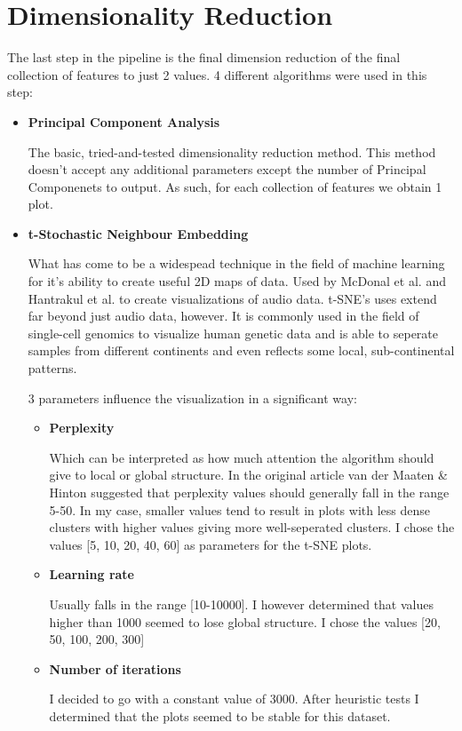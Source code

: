 \documentclass[a4paper, 12pt, twoside]{report}
\begin{document}
\section{Dimensionality Reduction}
\label{sec:orgfde1e30}

The last step in the pipeline is the final dimension reduction of the final collection of features to just 2 values. 4 different algorithms were used in this step:
\begin{itemize}
\item \textbf{Principal Component Analysis}

The basic, tried-and-tested dimensionality reduction method. This method doesn't accept any additional parameters except the number of Principal Componenets to output. As such, for each collection of features we obtain 1 plot.
\item \textbf{t-Stochastic Neighbour Embedding}

What has come to be a widespead technique in the field of machine learning for it's ability to create useful 2D maps of data. Used by McDonal et al. and Hantrakul et al. to create visualizations of audio data. t-SNE's uses extend far beyond just audio data, however. It is commonly used in the field of single-cell genomics to visualize human genetic data \cite{doi:10.1142/S0219720017500172} and is able to seperate samples from different continents and even reflects some local, sub-continental patterns.

3 parameters influence the visualization in a significant way:
\begin{itemize}
  \item \textbf{Perplexity}

    Which can be interpreted as how much attention the algorithm should give to local or global structure. In the original article van der Maaten \& Hinton suggested that perplexity values should generally fall in the range 5-50. In my case, smaller values tend to result in plots with less dense clusters with higher values giving more well-seperated clusters. I chose the values [5, 10, 20, 40, 60] as parameters for the t-SNE plots.
  \item \textbf{Learning rate}

    Usually falls in the range [10-10000]. I however determined that values higher than 1000 seemed to lose global structure. I chose the values [20, 50, 100, 200, 300]
  \item \textbf{Number of iterations}

    I decided to go with a constant value of 3000. After heuristic tests I determined that the plots seemed to be stable for this dataset.
\end{itemize}


\end{itemize}
\end{document}
